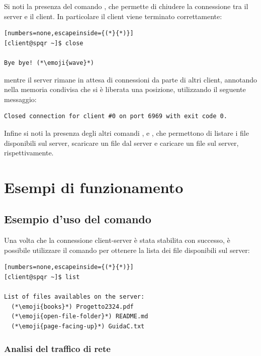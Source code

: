 Si noti la presenza del comando , che permette di chiudere la connessione tra il server e il client.
In particolare il client viene terminato correttamente:

\begin{lstlisting}[numbers=none,escapeinside={(*}{*)}]
[client@spqr ~]$ close

Bye bye! (*\emoji{wave}*)
\end{lstlisting}

mentre il server rimane in attesa di connessioni da parte di altri client, annotando nella memoria condivisa che si è liberata una posizione, utilizzando il seguente messaggio:

\begin{lstlisting}[numbers=none]
Closed connection for client #0 on port 6969 with exit code 0.
\end{lstlisting}

Infine si noti la presenza degli altri comandi ,  e , che permettono di listare i file disponibili sul server, scaricare un file dal server e caricare un file sul server, rispettivamente.

\section{Esempi di funzionamento}

\subsection{Esempio d'uso del comando }

Una volta che la connessione client-server è stata stabilita con successo, è possibile utilizzare il comando  per ottenere la lista dei file disponibili sul server:

\begin{lstlisting}[numbers=none,escapeinside={(*}{*)}]
[client@spqr ~]$ list

List of files availables on the server:
  (*\emoji{books}*) Progetto2324.pdf
  (*\emoji{open-file-folder}*) README.md
  (*\emoji{page-facing-up}*) GuidaC.txt
\end{lstlisting}

\subsubsection{Analisi del traffico di rete }

